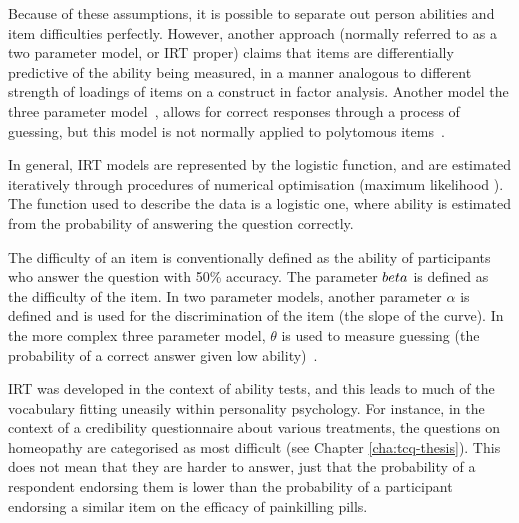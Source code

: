 Because of these assumptions, it is possible to separate out person abilities and item difficulties perfectly. However, another approach (normally referred to as a two parameter model, or IRT proper) claims that items are differentially predictive of the ability being measured, in a manner analogous to different strength of loadings of items on a construct in factor analysis. Another model the three parameter model~\cite{lord1968statistical}, allows for correct responses through a process of guessing, but this model is not normally applied to polytomous items~\cite{van1997handbook,Mair2010}.


In general, IRT models are represented by the logistic function, and are estimated iteratively through procedures of numerical optimisation (maximum likelihood \cite{fischer1995rasch}). The function used to describe the data is a logistic one, where ability is estimated from the probability of answering the question correctly. %

The difficulty of an item is conventionally defined as the ability of participants who answer the question with 50\% accuracy. The parameter $\\beta$ is defined as the difficulty of the item. In two parameter models, another parameter $\alpha$ is defined and is used for the discrimination of the item (the slope of the curve). In the more complex three parameter model, $\theta$ is used to measure guessing (the probability of a correct answer given low ability)~\cite{van1997handbook}.

IRT was developed in the context of ability tests, and this leads to much of the vocabulary fitting uneasily within personality psychology. For instance, in the context of a credibility questionnaire about various treatments, the questions on homeopathy are categorised as most difficult (see Chapter \ref{cha:tcq-thesis}). This does not mean that they are harder to answer, just that the probability of a respondent endorsing them is lower than the probability of a participant endorsing a similar item on the efficacy of painkilling pills.

